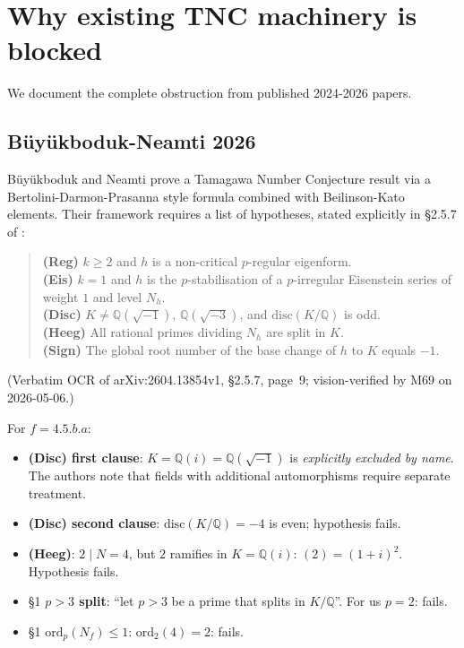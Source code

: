 \documentclass[12pt]{amsart}
\theoremstyle{definition}
\newcommand{\Q}{\mathbb{Q}}
\begin{document}
\section{Why existing TNC machinery is blocked}
\label{sec:blocked}

We document the complete obstruction from published 2024-2026 papers.

\subsection{Büyükboduk-Neamti 2026}

Büyükboduk and Neamti \cite{BN26} prove a Tamagawa Number Conjecture
result via a Bertolini-Darmon-Prasanna style formula combined with
Beilinson-Kato elements. Their framework requires a list of hypotheses,
stated explicitly in §2.5.7 of \cite{BN26}:

\begin{quote}
\textbf{(Reg)} $k \geq 2$ and $h$ is a non-critical $p$-regular eigenform.\\
\textbf{(Eis)} $k = 1$ and $h$ is the $p$-stabilisation of a $p$-irregular Eisenstein series of weight $1$ and level $N_h$.\\
\textbf{(Disc)} $K \neq \Q(\sqrt{-1}),\, \Q(\sqrt{-3})$, and $\mathrm{disc}(K/\Q)$ is odd.\\
\textbf{(Heeg)} All rational primes dividing $N_h$ are split in $K$.\\
\textbf{(Sign)} The global root number of the base change of $h$ to $K$ equals $-1$.
\end{quote}

(Verbatim OCR of arXiv:2604.13854v1, §2.5.7, page~9; vision-verified by M69 on 2026-05-06.)

For $f = 4.5.b.a$:
\begin{itemize}
  \item \textbf{(Disc) first clause}: $K = \Q(i) = \Q(\sqrt{-1})$ is \emph{explicitly excluded by name}.
    The authors note that fields with additional automorphisms require separate treatment.
  \item \textbf{(Disc) second clause}: $\mathrm{disc}(K/\Q) = -4$ is even; hypothesis fails.
  \item \textbf{(Heeg)}: $2 \mid N = 4$, but $2$ ramifies in $K = \Q(i)$: $(2) = (1+i)^2$. Hypothesis fails.
  \item §1 \textbf{$p > 3$ split}: ``let $p > 3$ be a prime that splits in $K/\Q$''. For us $p = 2$: fails.
  \item §1 \textbf{$\mathrm{ord}_p(N_f) \leq 1$}: $\mathrm{ord}_2(4) = 2$: fails.
\end{itemize}
\end{document}
